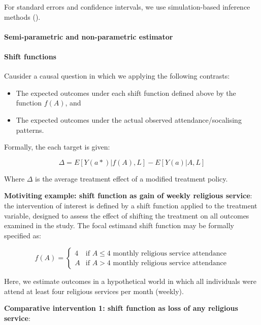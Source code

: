 \documentclass[
  singlecolumn]{article}
\let\oldparagraph\paragraph
\renewcommand{\paragraph}[1]{\oldparagraph{#1}\mbox{}}
\providecommand{\tightlist}{%
  \setlength{\itemsep}{0pt}\setlength{\parskip}{0pt}}\usepackage{longtable,booktabs,array}
\begin{document}
For standard errors and confidence intervals, we use simulation-based
inference methods ().

\paragraph{Semi-parametric and non-parametric
estimator}\label{semi-parametric-and-non-parametric-estimator}

\paragraph{Shift functions}\label{shift-functions}

Causider a causal question in which we applying the following contrasts:

\begin{itemize}
\tightlist
\item
  The expected outcomes under each shift function defined above by the
  function \(f(A)\), and
\item
  The expected outcomes under the actual observed attendance/socalising
  patterns.
\end{itemize}

Formally, the each target is given:

\[ \Delta = E[Y(a*)|f(A),L] - E[Y(a)|A,L] \]

Where \(\Delta\) is the average treatment effect of a modified treatment
policy.

\textbf{Motiviting example: shift function as gain of weekly religious
service}: the intervention of interest is defined by a shift function
applied to the treatment variable, designed to assess the effect of
shifting the treatment on all outcomes examined in the study. The focal
estimand shift function may be formally specified as:

\[f(A) = \begin{cases} 4 & \text{if } A \leq 4  \text{ monthly religious service attendance} \\ A & \text{if } A > 4  \text{ monthly religious service attendance} \end{cases} \]

Here, we estimate outcomes in a hypothetical world in which all
individuals were attend at least four religious services per month
(weekly).

\textbf{Comparative intervention 1: shift function as loss of any
religious service}:
\end{document}
